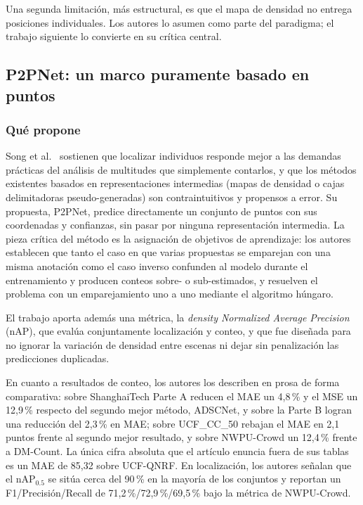 Una segunda limitación, más estructural, es que el mapa de densidad no
entrega posiciones individuales. Los autores lo asumen como parte del
paradigma; el trabajo siguiente lo convierte en su crítica central.

\subsection{P2PNet: un marco puramente basado en puntos}
\label{sec:ant-p2pnet}

\subsubsection*{Qué propone}

Song et al.~\cite{Song_2021_ICCV} sostienen que localizar individuos
responde mejor a las demandas prácticas del análisis de multitudes que
simplemente contarlos, y que los métodos existentes basados en
representaciones intermedias (mapas de densidad o cajas delimitadoras
pseudo-generadas) son contraintuitivos y propensos a error. Su
propuesta, P2PNet, predice directamente un conjunto de puntos con sus
coordenadas y confianzas, sin pasar por ninguna representación
intermedia. La pieza crítica del método es la asignación de objetivos de
aprendizaje: los autores establecen que tanto el caso en que varias
propuestas se emparejan con una misma anotación como el caso inverso
confunden al modelo durante el entrenamiento y producen conteos sobre- o
sub-estimados, y resuelven el problema con un emparejamiento uno a uno
mediante el algoritmo húngaro.

El trabajo aporta además una métrica, la \emph{density Normalized Average
Precision} (nAP), que evalúa conjuntamente localización y conteo, y que
fue diseñada para no ignorar la variación de densidad entre escenas ni
dejar sin penalización las predicciones duplicadas.

En cuanto a resultados de conteo, los autores los describen en prosa de
forma comparativa: sobre ShanghaiTech Parte A reducen el MAE un 4,8\,\% y
el MSE un 12,9\,\% respecto del segundo mejor método, ADSCNet, y sobre la
Parte B logran una reducción del 2,3\,\% en MAE; sobre UCF\_CC\_50 rebajan
el MAE en 2,1 puntos frente al segundo mejor resultado, y sobre
NWPU-Crowd un 12,4\,\% frente a DM-Count. La única cifra absoluta que el
artículo enuncia fuera de sus tablas es un MAE de 85,32 sobre UCF-QNRF.
En localización, los autores señalan que el nAP$_{0.5}$ se sitúa cerca del
90\,\% en la mayoría de los conjuntos y reportan un F1/Precisión/Recall de
71,2\,\%/72,9\,\%/69,5\,\% bajo la métrica de NWPU-Crowd.

